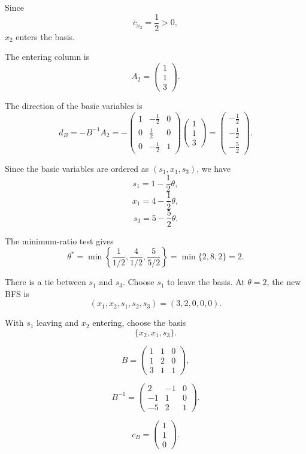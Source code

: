 \documentclass{article}
\begin{document}
Since
\[
\bar c_{x_2}=\frac12>0,
\]
$x_2$ enters the basis.

The entering column is
\[
A_2=
\begin{pmatrix}
1\\
1\\
3
\end{pmatrix}.
\]

The direction of the basic variables is
\[
d_B=-B^{-1}A_2
=
-
\begin{pmatrix}
1&-\frac12&0\\
0&\frac12&0\\
0&-\frac12&1
\end{pmatrix}
\begin{pmatrix}
1\\
1\\
3
\end{pmatrix}
=
\begin{pmatrix}
-\frac12\\
-\frac12\\
-\frac52
\end{pmatrix}.
\]

Since the basic variables are ordered as $(s_1,x_1,s_3)$, we have
\[
s_1=1-\frac12\theta,
\]
\[
x_1=4-\frac12\theta,
\]
\[
s_3=5-\frac52\theta.
\]

The minimum-ratio test gives
\[
\theta^*
=
\min\left\{
\frac{1}{1/2},
\frac{4}{1/2},
\frac{5}{5/2}
\right\}
=
\min\{2,8,2\}
=2.
\]

There is a tie between $s_1$ and $s_3$. Choose $s_1$ to leave the
basis. At $\theta=2$, the new BFS is
\[
(x_1,x_2,s_1,s_2,s_3)
=
(3,2,0,0,0).
\]



With $s_1$ leaving and $x_2$ entering, choose the basis
\[
\{x_2,x_1,s_3\}.
\]


\[
B=
\begin{pmatrix}
1&1&0\\
1&2&0\\
3&1&1
\end{pmatrix},
\]

\[
B^{-1}
=
\begin{pmatrix}
2&-1&0\\
-1&1&0\\
-5&2&1
\end{pmatrix}.
\]


\[
c_B=
\begin{pmatrix}
1\\
1\\
0
\end{pmatrix}.
\]
\end{document}
